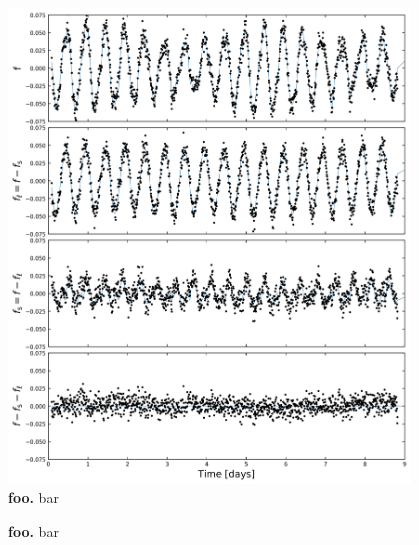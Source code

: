\documentclass[12pt,twocolumn,tighten]{aastex62}
\begin{document}
\begin{figure}[t]
	\begin{center}
		\leavevmode
		\includegraphics[width=0.95\textwidth]{f1.png}
	\end{center}
	\vspace{-0.7cm}
	\caption{ {\bf foo.}
    bar
		\label{fig:lc_map}
	}
\end{figure}

\begin{figure}[t]
	\vspace{-0.7cm}
	\caption{ {\bf foo.}
    bar
		\label{fig:splitsignal}
	}
\end{figure}
\end{document}
